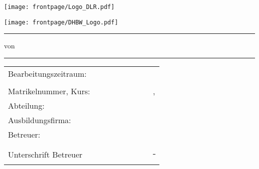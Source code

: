 \begin{titlepage}

	\begin{minipage}{.45\textwidth}
		\texttt{[image: frontpage/Logo\_DLR.pdf]}
	\end{minipage}
	\hfill
	\begin{minipage}{.45\textwidth}
		\begin{flushright}
			\texttt{[image: frontpage/DHBW\_Logo.pdf]}
		\end{flushright}
	\end{minipage}
	
	\rule{\textwidth}{.5pt}
	
	\vspace{0.5cm}
	
	\centering
	
	\large{\textbf{\themaA}}
	\vspace{0.5cm}
					
	\large{\textbf{\themaB}}
	\vspace{.75cm}
	
	\large{\titel}
	\vspace{0.5cm}

	von\\
	\Large{\autor}
	\vspace{0.5cm}
	
	\abgabe				

	\vfill
	
	\small
	\centering
	\rule{\textwidth}{.5pt}
	\begin{tabular}{ll}
		Bearbeitungszeitraum: $\quad\quad\quad\quad\quad\quad\quad$ & \praxisA \\ &\praxisB\\
		Matrikelnummer, Kurs: & \matrikelnr, \jahrgang\\
		Abteilung: & \abteilung\\
		Ausbildungsfirma: & \dlr\\
		Betreuer: & \betreuer\\ \\
		Unterschrift Betreuer & \rule[-.25cm]{.35\columnwidth}{.5pt}
	\end{tabular}

\end{titlepage}